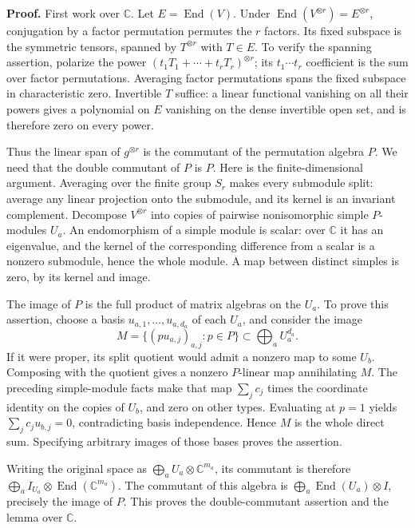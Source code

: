 \documentclass[
]{article}
\begin{document}
\textbf{Proof.} First work over \(\mathbb C\). Let
\(E=\operatorname{End}(V)\). Under
\(\operatorname{End}(V^{\otimes r})=E^{\otimes r}\), conjugation by a
factor permutation permutes the \(r\) factors. Its fixed subspace is the
symmetric tensors, spanned by \(T^{\otimes r}\) with \(T\in E\). To
verify the spanning assertion, polarize the power
\((t_1T_1+\cdots+t_rT_r)^{\otimes r}\); its \(t_1\cdots t_r\)
coefficient is the sum over factor permutations. Averaging factor
permutations spans the fixed subspace in characteristic zero. Invertible
\(T\) suffice: a linear functional vanishing on all their powers gives a
polynomial on \(E\) vanishing on the dense invertible open set, and is
therefore zero on every power.

Thus the linear span of \(g^{\otimes r}\) is the commutant of the
permutation algebra \(P\). We need that the double commutant of \(P\) is
\(P\). Here is the finite-dimensional argument. Averaging over the
finite group \(S_r\) makes every submodule split: average any linear
projection onto the submodule, and its kernel is an invariant
complement. Decompose \(V^{\otimes r}\) into copies of pairwise
nonisomorphic simple \(P\)-modules \(U_a\). An endomorphism of a simple
module is scalar: over \(\mathbb C\) it has an eigenvalue, and the
kernel of the corresponding difference from a scalar is a nonzero
submodule, hence the whole module. A map between distinct simples is
zero, by its kernel and image.

The image of \(P\) is the full product of matrix algebras on the
\(U_a\). To prove this assertion, choose a basis
\(u_{a,1},\ldots,u_{a,d_a}\) of each \(U_a\), and consider the image \[
M=\{(pu_{a,j})_{a,j}:p\in P\}
\subset\bigoplus_aU_a^{d_a}.
\] If it were proper, its split quotient would admit a nonzero map to
some \(U_b\). Composing with the quotient gives a nonzero \(P\)-linear
map annihilating \(M\). The preceding simple-module facts make that map
\(\sum_jc_j\) times the coordinate identity on the copies of \(U_b\),
and zero on other types. Evaluating at \(p=1\) yields
\(\sum_jc_ju_{b,j}=0\), contradicting basis independence. Hence \(M\) is
the whole direct sum. Specifying arbitrary images of those bases proves
the assertion.

Writing the original space as \(\bigoplus_a U_a\otimes\mathbb C^{m_a}\),
its commutant is therefore
\(\bigoplus_a I_{U_a}\otimes\operatorname{End}(\mathbb C^{m_a})\). The
commutant of this algebra is
\(\bigoplus_a\operatorname{End}(U_a)\otimes I\), precisely the image of
\(P\). This proves the double-commutant assertion and the lemma over
\(\mathbb C\).
\end{document}
